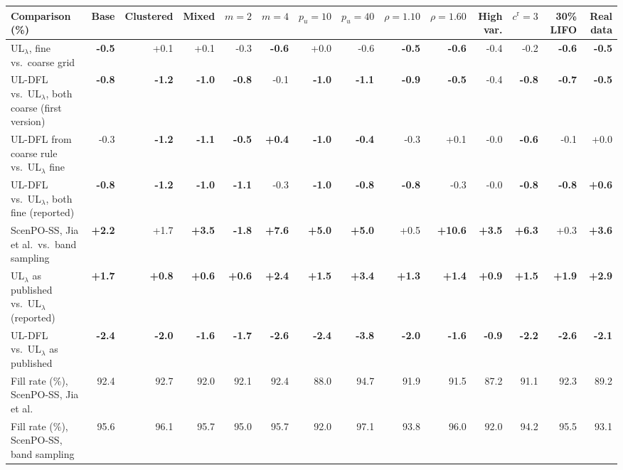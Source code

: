 \begin{tabular}{lrrrrrrrrrrrrr}
\toprule
Comparison (\%) & Base & Clustered & Mixed & $m=2$ & $m=4$ & $p_u=10$ & $p_u=40$ & $\rho=1.10$ & $\rho=1.60$ & High var. & $c^{\mathrm{r}}=3$ & 30\% LIFO & Real data \\
\midrule
UL$_\lambda$, fine vs.\ coarse grid & \textbf{-0.5} & +0.1 & +0.1 & -0.3 & \textbf{-0.6} & +0.0 & -0.6 & \textbf{-0.5} & \textbf{-0.6} & -0.4 & -0.2 & \textbf{-0.6} & \textbf{-0.5} \\
UL-DFL vs.\ UL$_\lambda$, both coarse (first version) & \textbf{-0.8} & \textbf{-1.2} & \textbf{-1.0} & \textbf{-0.8} & -0.1 & \textbf{-1.0} & \textbf{-1.1} & \textbf{-0.9} & \textbf{-0.5} & -0.4 & \textbf{-0.8} & \textbf{-0.7} & \textbf{-0.5} \\
UL-DFL from coarse rule vs.\ UL$_\lambda$ fine & -0.3 & \textbf{-1.2} & \textbf{-1.1} & \textbf{-0.5} & \textbf{+0.4} & \textbf{-1.0} & \textbf{-0.4} & -0.3 & +0.1 & -0.0 & \textbf{-0.6} & -0.1 & +0.0 \\
UL-DFL vs.\ UL$_\lambda$, both fine (reported) & \textbf{-0.8} & \textbf{-1.2} & \textbf{-1.0} & \textbf{-1.1} & -0.3 & \textbf{-1.0} & \textbf{-0.8} & \textbf{-0.8} & -0.3 & -0.0 & \textbf{-0.8} & \textbf{-0.8} & \textbf{+0.6} \\
ScenPO-SS, Jia et al.\ vs.\ band sampling & \textbf{+2.2} & +1.7 & \textbf{+3.5} & \textbf{-1.8} & \textbf{+7.6} & \textbf{+5.0} & \textbf{+5.0} & +0.5 & \textbf{+10.6} & \textbf{+3.5} & \textbf{+6.3} & +0.3 & \textbf{+3.6} \\
UL$_\lambda$ as published vs.\ UL$_\lambda$ (reported) & \textbf{+1.7} & \textbf{+0.8} & \textbf{+0.6} & \textbf{+0.6} & \textbf{+2.4} & \textbf{+1.5} & \textbf{+3.4} & \textbf{+1.3} & \textbf{+1.4} & \textbf{+0.9} & \textbf{+1.5} & \textbf{+1.9} & \textbf{+2.9} \\
UL-DFL vs.\ UL$_\lambda$ as published & \textbf{-2.4} & \textbf{-2.0} & \textbf{-1.6} & \textbf{-1.7} & \textbf{-2.6} & \textbf{-2.4} & \textbf{-3.8} & \textbf{-2.0} & \textbf{-1.6} & \textbf{-0.9} & \textbf{-2.2} & \textbf{-2.6} & \textbf{-2.1} \\
\midrule
Fill rate (\%), ScenPO-SS, Jia et al. & 92.4 & 92.7 & 92.0 & 92.1 & 92.4 & 88.0 & 94.7 & 91.9 & 91.5 & 87.2 & 91.1 & 92.3 & 89.2 \\
Fill rate (\%), ScenPO-SS, band sampling & 95.6 & 96.1 & 95.7 & 95.0 & 95.7 & 92.0 & 97.1 & 93.8 & 96.0 & 92.0 & 94.2 & 95.5 & 93.1 \\
\bottomrule
\end{tabular}
